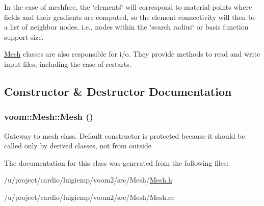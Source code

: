 In the case of meshfree, the \char`\"{}elements\char`\"{} will correspond to material points where fields and their gradients are computed, so the element connectivity will then be a list of neighbor nodes, i.e., nodes within the \char`\"{}search radius\char`\"{} or basis function support size.

\hyperlink{classvoom_1_1_mesh}{Mesh} classes are also responsible for i/o. They provide methods to read and write input files, including the case of restarts. 

\subsection{Constructor \& Destructor Documentation}
\hypertarget{classvoom_1_1_mesh_a6bb4b6118d3eeffcbea587aa8c533ac0}{
\subsubsection[{Mesh}]{\setlength{\rightskip}{0pt plus 5cm}voom::Mesh::Mesh ()}}
\label{classvoom_1_1_mesh_a6bb4b6118d3eeffcbea587aa8c533ac0}


Gateway to mesh class. Default constructor is protected because it should be called only by derived classes, not from outside 

The documentation for this class was generated from the following files:\begin{DoxyCompactItemize}
\item 
/u/project/cardio/luigiemp/voom2/src/Mesh/\hyperlink{_mesh_8h}{Mesh.h}\item 
/u/project/cardio/luigiemp/voom2/src/Mesh/Mesh.cc\end{DoxyCompactItemize}
